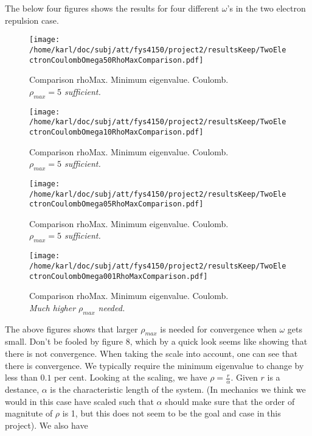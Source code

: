 \documentclass{article}
\begin{document}
The below four figures shows the results for four different $\omega$'s in the two electron repulsion case.

\begin{minipage}{.49\textwidth} %
	\begin{figure}[H]
		\centering
		\texttt{[image: /home/karl/doc/subj/att/fys4150/project2/resultsKeep/TwoElectronCoulombOmega50RhoMaxComparison.pdf]}
		\caption{Comparison rhoMax. Minimum eigenvalue. Coulomb. \\
			\textit{$\rho_{max} = 5$ sufficient.}}
		\label{1}
	\end{figure}
\end{minipage}\hfill
\begin{minipage}{.49\textwidth}
	\begin{figure}[H]
		\centering
		\texttt{[image: /home/karl/doc/subj/att/fys4150/project2/resultsKeep/TwoElectronCoulombOmega10RhoMaxComparison.pdf]}
		\caption{Comparison rhoMax. Minimum eigenvalue. Coulomb. \\
			\textit{$\rho_{max} = 5$ sufficient.}}
		\label{1}
	\end{figure}
\end{minipage}\hfill
\begin{minipage}{.49\textwidth}
	\begin{figure}[H]
		\centering
		\texttt{[image: /home/karl/doc/subj/att/fys4150/project2/resultsKeep/TwoElectronCoulombOmega05RhoMaxComparison.pdf]}
		\caption{Comparison rhoMax. Minimum eigenvalue. Coulomb. \\
		\textit{$\rho_{max} = 5$ sufficient.}}
		\label{1}
	\end{figure}
\end{minipage}\hfill
\vspace{2ex}
\begin{minipage}{.49\textwidth}
	\begin{figure}[H]
		\centering
		\texttt{[image: /home/karl/doc/subj/att/fys4150/project2/resultsKeep/TwoElectronCoulombOmega001RhoMaxComparison.pdf]}
		\caption{Comparison rhoMax. Minimum eigenvalue. Coulomb. \\
			\textit{Much higher $\rho_{max}$ needed.}}
		\label{1}
	\end{figure}
\end{minipage}\hfill
\vspace{2ex}

The above figures shows that larger $\rho_{max}$ is needed for convergence when $\omega$ gets small. Don't be fooled by figure 8, which by a quick look seems like showing that there is not convergence. When taking the scale into account, one can see that there is convergence. We typically require the minimum eigenvalue to change by less than $0.1$ per cent. Looking at the scaling, we have $\rho = \frac{r}{\alpha}$. Given $r$ is a destance, $\alpha$ is the characteristic length of the system. (In mechanics we think we would in this case have scaled such that $\alpha$ should make sure that the order of magnitute of $\rho$ is 1, but this does not seem to be the goal and case in this project). We also have 
\end{document}
